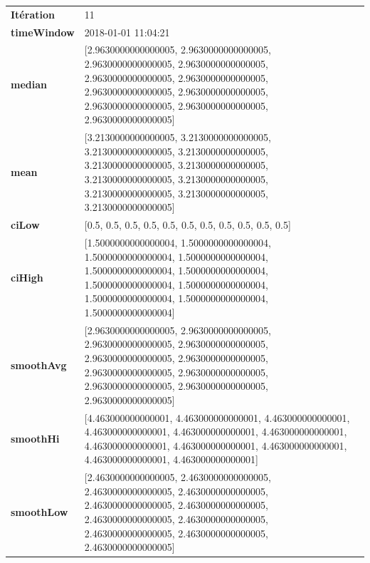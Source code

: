 \begin{table}[H]
	\centering
	\begin{tabularx}{\textwidth}{lX}
		\textbf{Itération}& 11 \\
		\textbf{timeWindow}	 & 2018-01-01 11:04:21   \\
		\textbf{median} &[2.9630000000000005, 2.9630000000000005, 2.9630000000000005, 2.9630000000000005, 2.9630000000000005, 2.9630000000000005, 2.9630000000000005, 2.9630000000000005, 2.9630000000000005, 2.9630000000000005, 2.9630000000000005] 
		\\ 
		\textbf{mean} & [3.2130000000000005, 3.2130000000000005, 3.2130000000000005, 3.2130000000000005, 3.2130000000000005, 3.2130000000000005, 3.2130000000000005, 3.2130000000000005, 3.2130000000000005, 3.2130000000000005, 3.2130000000000005] 
		\\
		\textbf{ciLow} & [0.5, 0.5, 0.5, 0.5, 0.5, 0.5, 0.5, 0.5, 0.5, 0.5, 0.5]  \\
		\textbf{ciHigh}& [1.5000000000000004, 1.5000000000000004, 1.5000000000000004, 1.5000000000000004, 1.5000000000000004, 1.5000000000000004, 1.5000000000000004, 1.5000000000000004, 1.5000000000000004, 1.5000000000000004, 1.5000000000000004] 
		\\
		\textbf{smoothAvg} & [2.9630000000000005, 2.9630000000000005, 2.9630000000000005, 2.9630000000000005, 2.9630000000000005, 2.9630000000000005, 2.9630000000000005, 2.9630000000000005, 2.9630000000000005, 2.9630000000000005, 2.9630000000000005] 
		\\
		\textbf{smoothHi} & [4.463000000000001, 4.463000000000001, 4.463000000000001, 4.463000000000001, 4.463000000000001, 4.463000000000001, 4.463000000000001, 4.463000000000001, 4.463000000000001, 4.463000000000001, 4.463000000000001] 
		\\
		\textbf{smoothLow} & [2.4630000000000005, 2.4630000000000005, 2.4630000000000005, 2.4630000000000005, 2.4630000000000005, 2.4630000000000005, 2.4630000000000005, 2.4630000000000005, 2.4630000000000005, 2.4630000000000005, 2.4630000000000005]
		\\ 
	\end{tabularx} 
\end{table}

